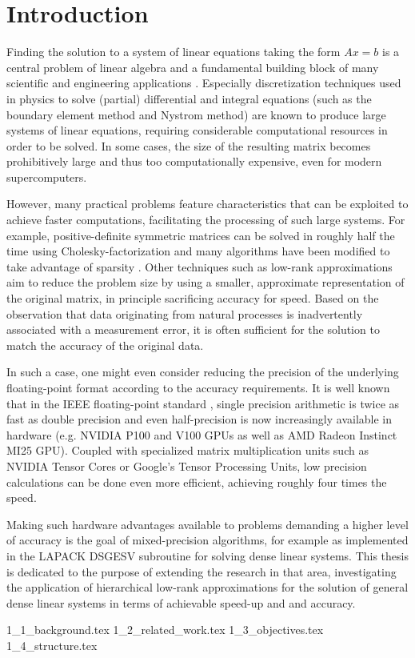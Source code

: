 \chapter{Introduction}
\label{chap:introduction}


Finding the solution to a system of linear equations taking the form $Ax=b$ is a central problem of linear algebra \cite{strang_introduction_2009} and a fundamental building block of many scientific and engineering applications \cite{carson_new_2017}. Especially discretization techniques used in physics to solve (partial) differential and integral equations (such as the boundary element method and Nystrom method) are known to produce large systems of linear equations, requiring considerable computational resources in order to be solved. In some cases, the size of the resulting matrix  becomes prohibitively large and thus too computationally expensive, even for modern supercomputers. 

However, many practical problems feature characteristics that can be exploited to achieve faster computations, facilitating the processing of such large systems. For example, positive-definite symmetric matrices can be solved in roughly half the time using Cholesky-factorization and many algorithms have been modified to take advantage of sparsity \cite{davis_direct_2006}. Other techniques such as low-rank approximations aim to reduce the problem size by using a smaller, approximate representation of the original matrix, in principle sacrificing accuracy for speed. Based on the observation that data originating from natural processes is inadvertently associated with a measurement error, it is often sufficient for the solution to match the accuracy of the original data. 

In such a case, one might even consider reducing the precision of the underlying floating-point format according to the accuracy requirements. It is well known that in the IEEE floating-point standard \cite{institute_of_electrical_and_electronics_engineers_ieee_2008}, single precision arithmetic is twice as fast as double precision \cite{buttari_mixed_2007} and even half-precision is now increasingly available in hardware (e.g. NVIDIA P100 and V100 GPUs as well as AMD Radeon Instinct MI25 GPU). Coupled with specialized matrix multiplication units such as NVIDIA Tensor Cores or Google's Tensor Processing Units, low precision calculations can be done even more efficient, achieving roughly four times the speed.

Making such hardware advantages available to problems demanding a higher level of accuracy is the goal of mixed-precision algorithms, for example as implemented in the LAPACK DSGESV \cite{buttari_mixed_2007} subroutine for solving dense linear systems. This thesis is dedicated to the purpose of extending the research in that area, investigating the application of hierarchical low-rank approximations for the solution of general dense linear systems in terms of achievable speed-up and and accuracy. 

{1_1_background.tex}
{1_2_related_work.tex}
{1_3_objectives.tex}
{1_4_structure.tex}
